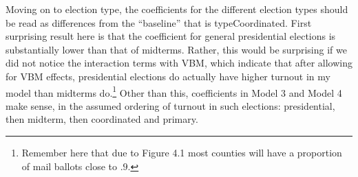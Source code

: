 \documentclass[12pt,twoside]{reedthesis}
\begin{document}
  Moving on to election type, the coefficients for the different election
  types should be read as differences from the ``baseline'' that is
  typeCoordinated. First surprising result here is that the coefficient
  for general presidential elections is substantially lower than that of
  midterms. Rather, this would be surprising if we did not notice the
  interaction terms with VBM, which indicate that after allowing for VBM
  effects, presidential elections do actually have higher turnout in my
  model than midterms do.\footnote{Remember here that due to Figure 4.1
    most counties will have a proportion of mail ballots close to \(.9\).}
  Other than this, coefficients in Model 3 and Model 4 make sense, in the
  assumed ordering of turnout in such elections: presidential, then
  midterm, then coordinated and primary.
  
\end{document}
